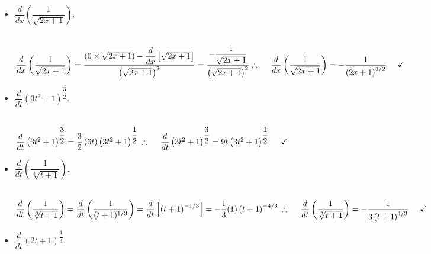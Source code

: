 \documentclass[fleqn]{article}
\begin{document}
\begin{enumerate}
\begin{itemize}
      \item $\dfrac{d}{dx} \left(\dfrac{1}{\sqrt{2x+1}}\right)$.

        \textcolor{hwColor}{
          \\
          $
            \dfrac{d}{dx} \left(\dfrac{1}{\sqrt{2x+1}}\right)=\dfrac{(0 \times \sqrt{2x+1})-\dfrac{d}{dx} \left[\sqrt{2x+1}\right]}{\left(\sqrt{2x+1}\right)^2}
            =\dfrac{-\dfrac{1}{\sqrt{2x+1}}}{\left(\sqrt{2x+1}\right)^2}
            \\
            \\
            \\
            \therefore ~~~~ \dfrac{d}{dx} \left(\dfrac{1}{\sqrt{2x+1}}\right)=-\dfrac{1}{\left(2x+1\right)^{3/2}} ~~~~ \checkmark
            \\
          $
        }

      \item $\dfrac{d}{dt} \left(3t^2+1\right)^{\dfrac{3}{2}}$.

        \textcolor{hwColor}{
          \\
          $
            \dfrac{d}{dt} \left(3t^2+1\right)^{\dfrac{3}{2}}=\dfrac{3}{2} \left(6t\right) \left(3t^2+1\right)^{\dfrac{1}{2}}
            \\
            \\
            \\
            \therefore ~~~~ \dfrac{d}{dt} \left(3t^2+1\right)^{\dfrac{3}{2}}=9t \left(3t^2+1\right)^{\dfrac{1}{2}} ~~~~ \checkmark
            \\
          $
        }

      \item $\dfrac{d}{dt} \left(\dfrac{1}{\sqrt[3]{t+1}}\right)$.

        \textcolor{hwColor}{
          \\
          $
            \dfrac{d}{dt} \left(\dfrac{1}{\sqrt[3]{t+1}}\right)
            =\dfrac{d}{dt} \left(\dfrac{1}{(t+1)^{1/3}}\right)
            =\dfrac{d}{dt} \left[\left(t+1\right)^{-1/3}\right]
            =-\dfrac{1}{3} (1) \left(t+1\right)^{-4/3}
            \\
            \\
            \\
            \therefore ~~~~ \dfrac{d}{dt} \left(\dfrac{1}{\sqrt[3]{t+1}}\right)=-\dfrac{1}{3\left(t+1\right)^{4/3}} ~~~~ \checkmark
            \\
          $
        }

      \item $\dfrac{d}{dt} \left(2t+1\right)^{\dfrac{1}{4}}$.


\end{itemize}
\end{enumerate}
\end{document}
